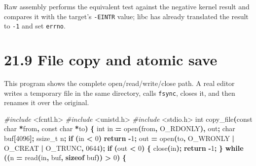 \documentclass[
  oneside,
  openany]{book}
\newenvironment{Shaded}{\begin{snugshade}}{\end{snugshade}}
\newcommand{\BaseNTok}[1]{\textcolor[rgb]{0.00,0.00,0.81}{#1}}
\newcommand{\ControlFlowTok}[1]{\textcolor[rgb]{0.13,0.29,0.53}{\textbf{#1}}}
\newcommand{\DataTypeTok}[1]{\textcolor[rgb]{0.13,0.29,0.53}{#1}}
\newcommand{\DecValTok}[1]{\textcolor[rgb]{0.00,0.00,0.81}{#1}}
\newcommand{\ImportTok}[1]{#1}
\newcommand{\KeywordTok}[1]{\textcolor[rgb]{0.13,0.29,0.53}{\textbf{#1}}}
\newcommand{\NormalTok}[1]{#1}
\newcommand{\OperatorTok}[1]{\textcolor[rgb]{0.81,0.36,0.00}{\textbf{#1}}}
\newcommand{\PreprocessorTok}[1]{\textcolor[rgb]{0.56,0.35,0.01}{\textit{#1}}}
\begin{document}
Raw assembly performs the equivalent test against the negative kernel
result and compares it with the target's \texttt{-EINTR} value; libc has
already translated the result to \texttt{-1} and set \texttt{errno}.

\hypertarget{file-copy-and-atomic-save}{%
\section{21.9 File copy and atomic
save}\label{file-copy-and-atomic-save}}

This program shows the complete open/read/write/close path. A real
editor writes a temporary file in the same directory, calls
\texttt{fsync}, closes it, and then renames it over the original.

\begin{Shaded}
\begin{Highlighting}[]
\PreprocessorTok{\#include }\ImportTok{\textless{}fcntl.h\textgreater{}}
\PreprocessorTok{\#include }\ImportTok{\textless{}unistd.h\textgreater{}}
\PreprocessorTok{\#include }\ImportTok{\textless{}stdio.h\textgreater{}}
\DataTypeTok{int}\NormalTok{ copy\_file}\OperatorTok{(}\DataTypeTok{const} \DataTypeTok{char} \OperatorTok{*}\NormalTok{from}\OperatorTok{,} \DataTypeTok{const} \DataTypeTok{char} \OperatorTok{*}\NormalTok{to}\OperatorTok{)} \OperatorTok{\{}
    \DataTypeTok{int}\NormalTok{ in }\OperatorTok{=}\NormalTok{ open}\OperatorTok{(}\NormalTok{from}\OperatorTok{,}\NormalTok{ O\_RDONLY}\OperatorTok{),}\NormalTok{ out}\OperatorTok{;}
    \DataTypeTok{char}\NormalTok{ buf}\OperatorTok{[}\DecValTok{4096}\OperatorTok{];} \DataTypeTok{ssize\_t}\NormalTok{ n}\OperatorTok{;}
    \ControlFlowTok{if} \OperatorTok{(}\NormalTok{in }\OperatorTok{\textless{}} \DecValTok{0}\OperatorTok{)} \ControlFlowTok{return} \OperatorTok{{-}}\DecValTok{1}\OperatorTok{;}
\NormalTok{    out }\OperatorTok{=}\NormalTok{ open}\OperatorTok{(}\NormalTok{to}\OperatorTok{,}\NormalTok{ O\_WRONLY }\OperatorTok{|}\NormalTok{ O\_CREAT }\OperatorTok{|}\NormalTok{ O\_TRUNC}\OperatorTok{,} \BaseNTok{0644}\OperatorTok{);}
    \ControlFlowTok{if} \OperatorTok{(}\NormalTok{out }\OperatorTok{\textless{}} \DecValTok{0}\OperatorTok{)} \OperatorTok{\{}\NormalTok{ close}\OperatorTok{(}\NormalTok{in}\OperatorTok{);} \ControlFlowTok{return} \OperatorTok{{-}}\DecValTok{1}\OperatorTok{;} \OperatorTok{\}}
    \ControlFlowTok{while} \OperatorTok{((}\NormalTok{n }\OperatorTok{=}\NormalTok{ read}\OperatorTok{(}\NormalTok{in}\OperatorTok{,}\NormalTok{ buf}\OperatorTok{,} \KeywordTok{sizeof}\NormalTok{ buf}\OperatorTok{))} \OperatorTok{\textgreater{}} \DecValTok{0}\OperatorTok{)} \OperatorTok{\{}

\end{Highlighting}
\end{Shaded}
\end{document}
